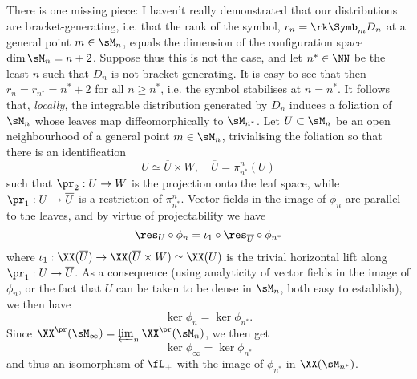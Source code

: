 \subsection{}
There is one missing piece: I haven't really demonstrated that our distributions
are bracket-generating, i.e. that 
the rank of the symbol, $r_n = \rk\Symb_m D_n$ at a general point $m \in \sM_n$,
equals the dimension of the configuration space $\dim\sM_n=n+2$. 
Suppose thus this is not the case, and let $n^* \in \NN$ be the least $n$
such that $D_n$ is not bracket generating. It is easy to see that 
then $r_n = r_{n^*} = n^*+2$ for all $n \ge n^*$, i.e. the symbol stabilises at $n=n^*$.
It follows that, \emph{locally,} the integrable distribution generated by $D_n$
induces a foliation of $\sM_n$ whose leaves map diffeomorphically to $\sM_{n^*}$.
Let $U \subset \sM_n$ be an open neighbourhood of a general point $m \in \sM_n$,
trivialising the foliation so that there is an identification
\[ U \simeq \overline U \times W,\quad \overline U = \pi^n_{n^*}(U) \]
such that $\pr_2 : U \to W$ is the projection onto the leaf space,
while $\pr_1 : U \to \overline U$ is a restriction of $\pi^n_{n^*}$.
Vector fields in the image of $\phi_n$ are parallel to the leaves,
and by virtue of projectability we have
\[ \res_U \circ \phi_n = \iota_1 \circ \res_{\overline U} \circ \phi_{n^*} \]
where $\iota_1 : \XX(\overline U) \to \XX(\overline U \times W) \simeq \XX(U)$
is the trivial horizontal lift along $\pr_1 :U \to \overline U$.
As a consequence (using analyticity of vector fields in the image of $\phi_n$,
or the fact that $U$ can be taken to be dense in $\sM_n$, both easy to establish),
we then have
\[ \ker \phi_n = \ker \phi_{n^*}. \]
Since $\XX^{\pr}(\sM_\infty) = \varprojlim_n \XX^{\pr}(\sM_n)$, we then get
\[ \ker \phi_\infty = \ker\phi_{n^*} \]
and thus an isomorphism of $\fL_+$ with the image of $\phi_{n^*}$ in $\XX(\sM_{n^*})$.

